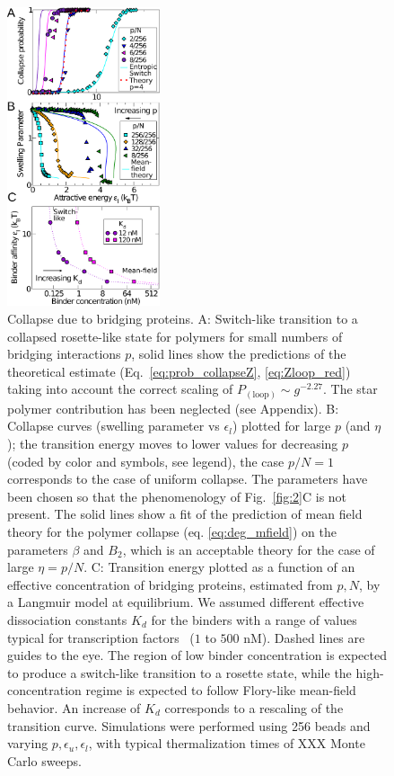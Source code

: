 \documentclass[
preprint,
a4paper,
12pt,
superscriptaddress,
pre]{revtex4}
\begin{document}
\begin{figure}
  \centering
  \includegraphics[width=0.4\textwidth]{fig3}
  \caption{Collapse due to bridging proteins.  A: Switch-like
    transition to a collapsed rosette-like state for polymers for
    small numbers of 
    bridging interactions $p$, solid lines show the predictions of
    the theoretical estimate (Eq.~\ref{eq:prob_collapseZ},
    \ref{eq:Zloop_red})
    taking into
    account the correct scaling of
    $P_\mathrm{(loop)} \sim g^{-2.27}$. The star polymer
    contribution has been neglected (see Appendix).
%
B: Collapse curves (swelling parameter vs
    $\epsilon_l$) plotted for large $p$ (and $\eta$); the transition
    energy moves to 
    lower values for decreasing $p$ (coded by color and
    symbols, see legend), the case $p/N=1$ corresponds to the case of
    uniform collapse. The parameters have been chosen so that the
    phenomenology of Fig.~\ref{fig:2}C is not present. The solid lines
    show a fit of the prediction of mean field theory for the polymer
    collapse (eq. \ref{eq:deg_mfield}) on the parameters $\beta$ and
    $B_2$, which is an acceptable theory for the case of large $\eta= p/N$.
C:  Transition energy plotted as a function of an effective
concentration  of bridging proteins, estimated  from $p,N$, by a 
Langmuir model at equilibrium. We assumed different effective
dissociation constants $K_d$  
for the binders with a range of values typical for transcription
factors~\cite{Buchler29042003} ($1$ to $500$ nM). Dashed lines are
guides to the eye. The region of low binder concentration is expected
to produce a switch-like transition to a rosette state, while the
high-concentration regime is expected to follow Flory-like mean-field
behavior. An 
increase of $K_d$ corresponds to a rescaling of the transition curve. 
%
Simulations were performed using 256 beads and varying
$p,\epsilon_u,\epsilon_l$, with typical thermalization times of XXX
Monte Carlo sweeps.  }
  \label{fig:3}
\end{figure}
\end{document}
